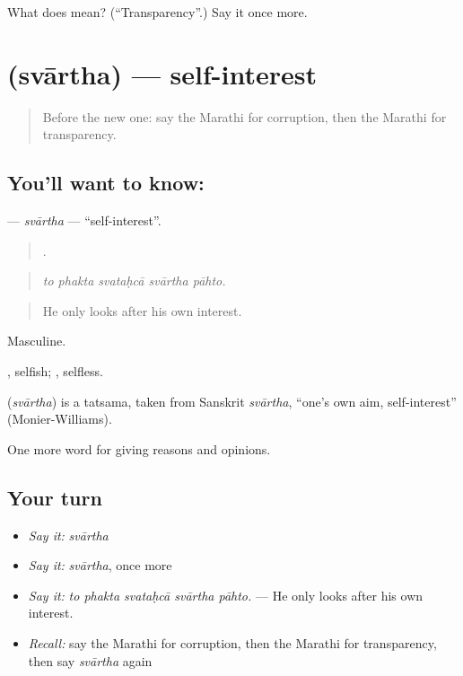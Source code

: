 \begin{tcolorbox}[breakable,colback=teal!4,colframe=teal!35!black,title={Before you move on}]
What does  mean? (\textquotedblleft{}Transparency\textquotedblright{}.) Say it once more.
\end{tcolorbox}
\section[\texorpdfstring{\mr{स्वार्थ} (svārtha)}{स्वार्थ (svārtha)}]{ (svārtha) — self-interest}

\label{lesson:MR-C363-svartha}



\begin{quote}
Before the new one: say the Marathi for corruption, then the Marathi for transparency.
\end{quote}

\subsection*{You'll want to know: }
\textbf{} — \emph{svārtha} — \textquotedblleft{}self-interest\textquotedblright{}.

\begin{quote}
    .
\end{quote}

\begin{quote}
\emph{to phakta svataḥcā svārtha pāhto.}
\end{quote}

\begin{quote}
He only looks after his own interest.
\end{quote}

Masculine.

, selfish; , selfless.

\begin{cousinweb}
\textbf{} (\emph{svārtha}) is a tatsama, taken from Sanskrit \emph{svārtha}, \textquotedblleft{}one's own aim, self-interest\textquotedblright{} (Monier-Williams).
\end{cousinweb}

\begin{grammarlens}[title={What you've built}]
One more word for giving reasons and opinions.
\end{grammarlens}

\subsection*{Your turn}
\begin{itemize}
\raggedright
  \item \emph{Say it:} \emph{svārtha}
  \item \emph{Say it:} \emph{svārtha}, once more
  \item \emph{Say it:} \emph{to phakta svataḥcā svārtha pāhto.} — He only looks after his own interest.
  \item \emph{Recall:} say the Marathi for corruption, then the Marathi for transparency, then say \emph{svārtha} again
\end{itemize}

